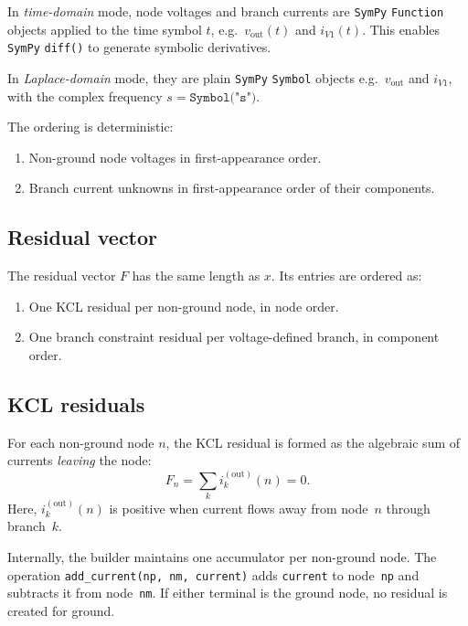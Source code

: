 \documentclass[11pt,a4paper]{article}
\newcommand{\code}[1]{\texttt{#1}}
\newcommand{\sympy}{\texttt{SymPy}}
\begin{document}
In \emph{time-domain} mode, node voltages and branch currents are
\sympy{} \code{Function} objects applied to the time symbol \(t\),
e.g.\ \(v_{\mathrm{out}}(t)\) and \(i_{V1}(t)\).
This enables \sympy{} \code{diff()} to generate symbolic derivatives.

In \emph{Laplace-domain} mode, they are plain \sympy{} \code{Symbol} objects
e.g.\ \(v_{\mathrm{out}}\) and \(i_{V1}\), with the complex frequency
\(s = \texttt{Symbol("s")}\).

The ordering is deterministic:
\begin{enumerate}[noitemsep]
    \item Non-ground node voltages in first-appearance order.
    \item Branch current unknowns in first-appearance order of their components.
\end{enumerate}

\subsection{Residual vector}

The residual vector \(F\) has the same length as \(x\).
Its entries are ordered as:
\begin{enumerate}[noitemsep]
    \item One KCL residual per non-ground node, in node order.
    \item One branch constraint residual per voltage-defined branch, in
          component order.
\end{enumerate}

\subsection{KCL residuals}

For each non-ground node \(n\), the KCL residual is formed as the
algebraic sum of currents \emph{leaving} the node:
\begin{equation}
    F_n = \sum_k i_k^{(\mathrm{out})}(n) = 0.
\end{equation}
Here, \(i_k^{(\mathrm{out})}(n)\) is positive when current flows away from
node~\(n\) through branch~\(k\).

Internally, the builder maintains one accumulator per non-ground node.
The operation \code{add\_current(np,~nm,~current)} adds \code{current} to
node~\code{np} and subtracts it from node~\code{nm}.
If either terminal is the ground node, no residual is created for ground.
\end{document}
